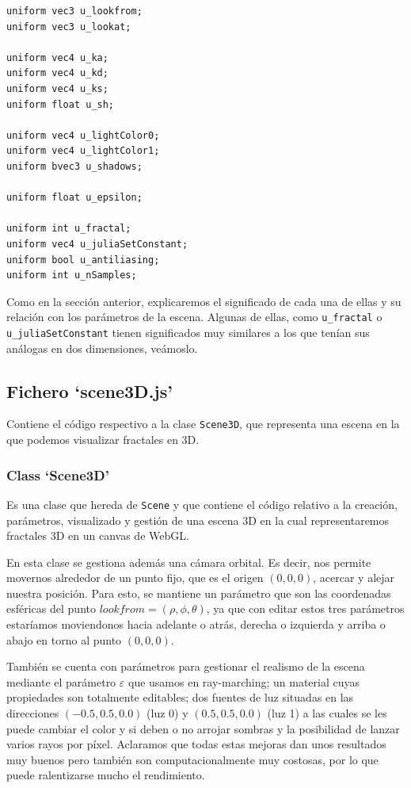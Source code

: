 \begin{lstlisting}
uniform vec3 u_lookfrom;
uniform vec3 u_lookat;

uniform vec4 u_ka;
uniform vec4 u_kd;
uniform vec4 u_ks;
uniform float u_sh;

uniform vec4 u_lightColor0;
uniform vec4 u_lightColor1;
uniform bvec3 u_shadows;

uniform float u_epsilon;

uniform int u_fractal;
uniform vec4 u_juliaSetConstant;
uniform bool u_antiliasing;
uniform int u_nSamples;
\end{lstlisting}

Como en la sección anterior, explicaremos el significado de cada una de ellas y su relación con los parámetros de la escena. Algunas de ellas, como \verb|u_fractal| o \verb|u_juliaSetConstant| tienen significados muy similares a los que tenían sus análogas en dos dimensiones, veámoslo.

\subsection{Fichero `scene3D.js'}

Contiene el código respectivo a la clase \verb|Scene3D|, que representa una escena en la que podemos visualizar fractales en 3D.

\subsubsection{Class `Scene3D'}

Es una clase que hereda de \verb|Scene| y que contiene el código relativo a la creación, parámetros, visualizado y gestión de una escena 3D en la cual representaremos fractales 3D en un canvas de WebGL. 

En esta clase se gestiona además una cámara orbital. Es decir, nos permite movernos alrededor de un punto fijo, que es el origen $(0,0,0)$, acercar y alejar nuestra posición. Para esto, se mantiene un parámetro que son las coordenadas esféricas del punto $lookfrom=(\rho,\phi,\theta)$, ya que con editar estos tres parámetros estaríamos moviendonos hacia adelante o atrás, derecha o izquierda y arriba o abajo en torno al punto $(0,0,0)$.

También se cuenta con parámetros para gestionar el realismo de la escena mediante el parámetro $\varepsilon$ que usamos en ray-marching; un material cuyas propiedades son totalmente editables; dos fuentes de luz situadas en las direcciones $(-0.5, 0.5, 0.0)$ (luz 0) y $(0.5, 0.5, 0.0)$ (luz 1) a las cuales se les puede cambiar el color y si deben o no arrojar sombras y la posibilidad de lanzar varios rayos por píxel. Aclaramos que todas estas mejoras dan unos resultados muy buenos pero también son computacionalmente muy costosas, por lo que puede ralentizarse mucho el rendimiento.

